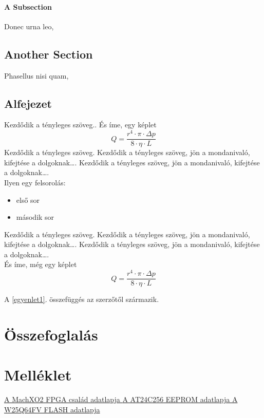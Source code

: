 \documentclass[a4paper,12pt,oneside]{book}
\begin{document}
\subsubsection{A Subsection}

Donec urna leo, 

\section{Another Section}

Phasellus nisi quam, 

\section{Alfejezet}
Kezdődik a tényleges szöveg..
És íme, egy képlet
\begin{equation}
Q=\frac{r^4\cdot \pi \cdot \Delta p}{8\cdot \eta\cdot L}
\end{equation}
Kezdődik a tényleges szöveg. Kezdődik a tényleges szöveg, jön a mondanivaló, kifejtése a dolgoknak…. Kezdődik a tényleges szöveg, jön a mondanivaló, kifejtése a dolgoknak….\\

Ilyen egy felsorolás:
\begin{itemize}
	\item első sor
	\item második sor
\end{itemize}
Kezdődik a tényleges szöveg. Kezdődik a tényleges szöveg, jön a mondanivaló, kifejtése a dolgoknak…. Kezdődik a tényleges szöveg, jön a mondanivaló, kifejtése a dolgoknak….\\

És íme, még egy képlet
\begin{equation}\label{egyenlet1}
Q=\frac{r^4\cdot \pi \cdot \Delta p}{8\cdot \eta\cdot L}
\end{equation}

A \ref{egyenlet1}. összefüggés az \cite{fpgaadatlap} szerzőtől származik.
\backmatter
\chapter{Összefoglalás}
\appendix
\fi
\chapter{Melléklet}


\renewcommand{\refname}{Irodalomjegyzék}
\begin{thebibliography}{9}
     \href{https://datasheet.octopart.com/LCMXO2-4000HC-4MG132I-Lattice-Semiconductor-datasheet-12584740.pdf}{A MachXO2 FPGA család adatlapja }
	  \href{https://ww1.microchip.com/downloads/en/DeviceDoc/doc0670.pdf}{A AT24C256 EEPROM adatlapja }
	 \href{https://ww1.microchip.com/downloads/en/DeviceDoc/doc0670.pdf}{A W25Q64FV FLASH adatlapja }
\end{thebibliography}
\end{document}
